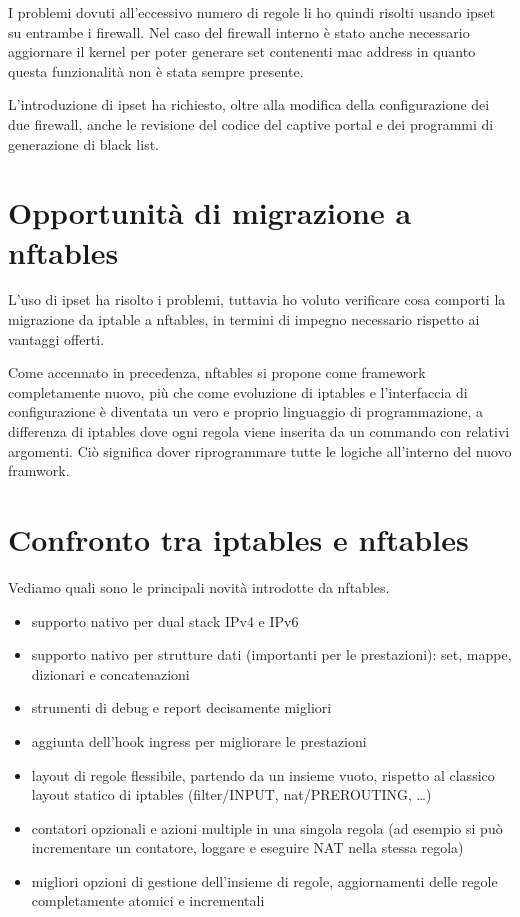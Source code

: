 I problemi dovuti all'eccessivo numero di regole li ho quindi risolti usando
ipset su entrambe i firewall.  Nel caso del firewall interno è stato anche
necessario aggiornare il kernel per poter generare set contenenti mac address
in quanto questa funzionalità non è stata sempre presente.

L'introduzione di ipset ha richiesto, oltre alla modifica della configurazione
dei due firewall, anche le revisione del codice del captive portal e dei
programmi di generazione di black list.

\section{Opportunità di migrazione a nftables}

L'uso di ipset ha risolto i problemi, tuttavia ho voluto verificare cosa
comporti la migrazione da iptable a nftables, in termini di impegno necessario
rispetto ai vantaggi offerti.

Come accennato in precedenza, nftables si propone come framework completamente
nuovo, più che come evoluzione di iptables  e l'interfaccia di configurazione
è diventata un vero e proprio linguaggio di programmazione, a differenza di
iptables dove ogni regola viene inserita da un commando con relativi
argomenti.  Ci\`o significa dover riprogrammare tutte le logiche all'interno
del nuovo framwork.

\section{Confronto tra iptables e nftables}

Vediamo quali sono le principali novit\`a introdotte da nftables.
\begin{itemize}
    \item supporto nativo per dual stack IPv4 e IPv6
    \item supporto nativo per strutture dati (importanti per le prestazioni):
    set, mappe, dizionari e concatenazioni
    \item strumenti di debug e report decisamente migliori
    \item aggiunta dell'hook ingress per migliorare le prestazioni
    \item layout di regole flessibile, partendo da un insieme vuoto, rispetto
    al classico layout statico di iptables (filter/INPUT, nat/PREROUTING,
    \ldots)
    \item contatori opzionali e azioni multiple in una singola regola (ad
    esempio si pu\`o incrementare un contatore, loggare e eseguire NAT nella
    stessa regola)
    \item migliori opzioni di gestione dell'insieme di regole, aggiornamenti
    delle regole completamente atomici e incrementali
\end{itemize}

